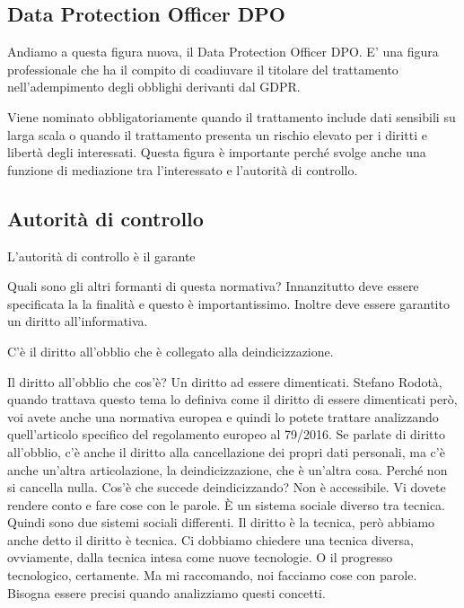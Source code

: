 \subsection{Data Protection Officer DPO}
Andiamo a questa figura nuova, il Data Protection Officer DPO.
E' una figura professionale che ha il compito di coadiuvare il titolare del trattamento nell'adempimento degli obblighi derivanti dal GDPR.

Viene nominato obbligatoriamente quando il trattamento include dati sensibili su larga scala o quando il trattamento presenta un rischio elevato per i diritti e libertà degli interessati.
Questa figura è importante perché svolge anche una funzione di mediazione tra l'interessato e l'autorità di controllo.

\subsection{Autorità di controllo}
L'autorità di controllo è il garante 

Quali sono gli altri formanti di questa normativa?
Innanzitutto deve essere specificata la la finalità e questo è importantissimo. Inoltre deve essere garantito un diritto all'informativa.

C'è il diritto all'obblio che è collegato alla deindicizzazione.

Il diritto all'obblio che cos'è?
Un diritto ad essere dimenticati. Stefano Rodotà, quando trattava questo tema lo definiva come il diritto di essere dimenticati però, voi avete anche una normativa europea e quindi lo potete trattare analizzando quell'articolo specifico del regolamento europeo al 79/2016.
Se parlate di diritto all'obblio, c'è anche il diritto alla cancellazione dei propri dati personali, ma c'è anche un'altra articolazione, la deindicizzazione, che è un'altra cosa.
Perché non si cancella nulla.
Cos'è che succede deindicizzando? Non è accessibile.
Vi dovete rendere conto e fare cose con le parole.
È un sistema sociale diverso tra tecnica.
Quindi sono due sistemi sociali differenti.
Il diritto è la tecnica, però abbiamo anche detto il diritto è tecnica.
Ci dobbiamo chiedere una tecnica diversa, ovviamente, dalla tecnica intesa come nuove tecnologie.
O il progresso tecnologico, certamente.
Ma mi raccomando, noi facciamo cose con parole.
Bisogna essere precisi quando analizziamo questi concetti.


